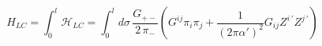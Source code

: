 \begin{equation}\label{eq:LC Hamiltonian}
    H_{LC} = \int_0^l \mathcal{H}_{LC} =
    \int_0^l d\sigma \, \frac{G_{+-}}{2 \,\pi_-}
    \left( G^{ij} \pi_i \pi_j +
    \frac{1}{(2\pi\alpha')^2} G_{ij} Z^{i\,\prime} Z^{j\,\prime}
    \right)
\end{equation}


